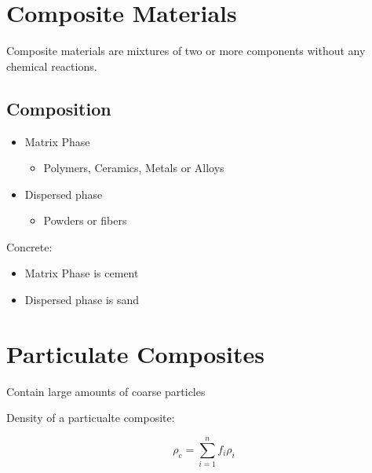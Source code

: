 \documentclass{article}
\begin{document}
\section*{Composite Materials}

Composite materials are mixtures of two or more components without any chemical reactions.

\subsection*{Composition}
\begin{itemize}
    \item Matrix Phase
          \begin{itemize}
              \item Polymers, Ceramics, Metals or Alloys
          \end{itemize}
    \item Dispersed phase
          \begin{itemize}
              \item Powders or fibers
          \end{itemize}
\end{itemize}

Concrete:
\begin{itemize}
    \item Matrix Phase is cement
    \item Dispersed phase is sand
\end{itemize}

\section*{Particulate Composites}
Contain large amounts of coarse particles

Density of a particualte composite:

\begin{equation*}
    \rho_c = \sum_{i=1}^n f_i \rho_i
\end{equation*}
\end{document}
